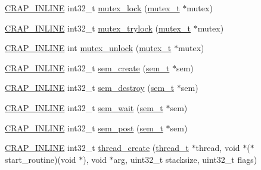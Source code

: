 \begin{DoxyCompactItemize}
\item 
\hyperlink{config__x86_8h_a5a40526b8d842e7ff731509998bb0f1c}{C\+R\+A\+P\+\_\+\+I\+N\+L\+I\+N\+E} int32\+\_\+t \hyperlink{namespacecrap_a8a2fb199b636e39b6deb57350be943d6}{mutex\+\_\+lock} (\hyperlink{namespacecrap_a1a552340e5d6bb679ebde38c74a802a8}{mutex\+\_\+t} $\ast$mutex)
\item 
\hyperlink{config__x86_8h_a5a40526b8d842e7ff731509998bb0f1c}{C\+R\+A\+P\+\_\+\+I\+N\+L\+I\+N\+E} int32\+\_\+t \hyperlink{namespacecrap_ad84469a7469fb4841d2d665b489a4f5e}{mutex\+\_\+trylock} (\hyperlink{namespacecrap_a1a552340e5d6bb679ebde38c74a802a8}{mutex\+\_\+t} $\ast$mutex)
\item 
\hyperlink{config__x86_8h_a5a40526b8d842e7ff731509998bb0f1c}{C\+R\+A\+P\+\_\+\+I\+N\+L\+I\+N\+E} int \hyperlink{namespacecrap_ac8ad95bf499ec9d212ad7ee98c9336a7}{mutex\+\_\+unlock} (\hyperlink{namespacecrap_a1a552340e5d6bb679ebde38c74a802a8}{mutex\+\_\+t} $\ast$mutex)
\item 
\hyperlink{config__x86_8h_a5a40526b8d842e7ff731509998bb0f1c}{C\+R\+A\+P\+\_\+\+I\+N\+L\+I\+N\+E} int32\+\_\+t \hyperlink{namespacecrap_aa710c62b7160db283dc1daf8c410a4d4}{sem\+\_\+create} (\hyperlink{namespacecrap_a8389bdde2ea5b1b5884c12d7f82c0e39}{sem\+\_\+t} $\ast$sem)
\item 
\hyperlink{config__x86_8h_a5a40526b8d842e7ff731509998bb0f1c}{C\+R\+A\+P\+\_\+\+I\+N\+L\+I\+N\+E} int32\+\_\+t \hyperlink{namespacecrap_a2a1da4954c35039a74668b7ae723c625}{sem\+\_\+destroy} (\hyperlink{namespacecrap_a8389bdde2ea5b1b5884c12d7f82c0e39}{sem\+\_\+t} $\ast$sem)
\item 
\hyperlink{config__x86_8h_a5a40526b8d842e7ff731509998bb0f1c}{C\+R\+A\+P\+\_\+\+I\+N\+L\+I\+N\+E} int32\+\_\+t \hyperlink{namespacecrap_a6918a2c0ffe394545e72a530a3c67512}{sem\+\_\+wait} (\hyperlink{namespacecrap_a8389bdde2ea5b1b5884c12d7f82c0e39}{sem\+\_\+t} $\ast$sem)
\item 
\hyperlink{config__x86_8h_a5a40526b8d842e7ff731509998bb0f1c}{C\+R\+A\+P\+\_\+\+I\+N\+L\+I\+N\+E} int32\+\_\+t \hyperlink{namespacecrap_a24ce856f7a9604d7659975720a1ff4ba}{sem\+\_\+post} (\hyperlink{namespacecrap_a8389bdde2ea5b1b5884c12d7f82c0e39}{sem\+\_\+t} $\ast$sem)
\item 
\hyperlink{config__x86_8h_a5a40526b8d842e7ff731509998bb0f1c}{C\+R\+A\+P\+\_\+\+I\+N\+L\+I\+N\+E} int32\+\_\+t \hyperlink{namespacecrap_a72adb742e4ac563c60aa7478787a116f}{thread\+\_\+create} (\hyperlink{namespacecrap_acd6ada6ce68b7a664e02cc09a05cdeb3}{thread\+\_\+t} $\ast$thread, void $\ast$($\ast$start\+\_\+routine)(void $\ast$), void $\ast$arg, uint32\+\_\+t stacksize, uint32\+\_\+t flags)

\end{DoxyCompactItemize}
